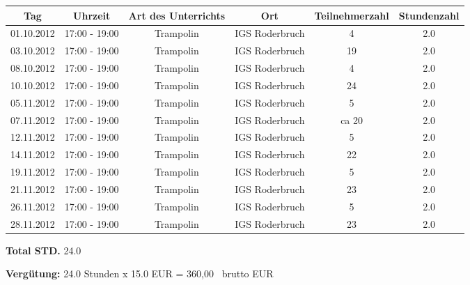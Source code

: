 \documentclass[a4paper,10pt,BCOR=0mm]{scrreprt}
\begin{document}
\begin{flushright}
\begin{tabular}{|c|c|c|c|c|c|}\hline
 \textbf{Tag}
&
 \textbf{Uhrzeit}
&
 \textbf{Art des Unterrichts}
&
\textbf{Ort}
&
\textbf{Teilnehmerzahl}
&
 \textbf{Stundenzahl}\\\hline\hline

01.10.2012
&
17:00 - 19:00
&
Trampolin
&
IGS Roderbruch
&
4
&
2.0
\\\hline


03.10.2012
&
17:00 - 19:00
&
Trampolin
&
IGS Roderbruch
&
19
&
2.0
\\\hline


08.10.2012
&
17:00 - 19:00
&
Trampolin
&
IGS Roderbruch
&
4
&
2.0
\\\hline


10.10.2012
&
17:00 - 19:00
&
Trampolin
&
IGS Roderbruch
&
24
&
2.0
\\\hline


05.11.2012
&
17:00 - 19:00
&
Trampolin
&
IGS Roderbruch
&
5
&
2.0
\\\hline


07.11.2012
&
17:00 - 19:00
&
Trampolin
&
IGS Roderbruch
&
ca 20
&
2.0
\\\hline


12.11.2012
&
17:00 - 19:00
&
Trampolin
&
IGS Roderbruch
&
5
&
2.0
\\\hline


14.11.2012
&
17:00 - 19:00
&
Trampolin
&
IGS Roderbruch
&
22
&
2.0
\\\hline


19.11.2012
&
17:00 - 19:00
&
Trampolin
&
IGS Roderbruch
&
5
&
2.0
\\\hline


21.11.2012
&
17:00 - 19:00
&
Trampolin
&
IGS Roderbruch
&
23
&
2.0
\\\hline


26.11.2012
&
17:00 - 19:00
&
Trampolin
&
IGS Roderbruch
&
5
&
2.0
\\\hline


28.11.2012
&
17:00 - 19:00
&
Trampolin
&
IGS Roderbruch
&
23
&
2.0
\\\hline



\end{tabular} 
\begin{flushright}
\parbox{5cm}{\textbf{Total STD.} 24.0}\end{flushright}
\hfill\hfill \textbf{Vergütung:} 24.0 Stunden x 15.0 EUR = 360,00 \officialeuro\  brutto EUR \hspace*{2cm}\\
\end{flushright}
\end{document}
